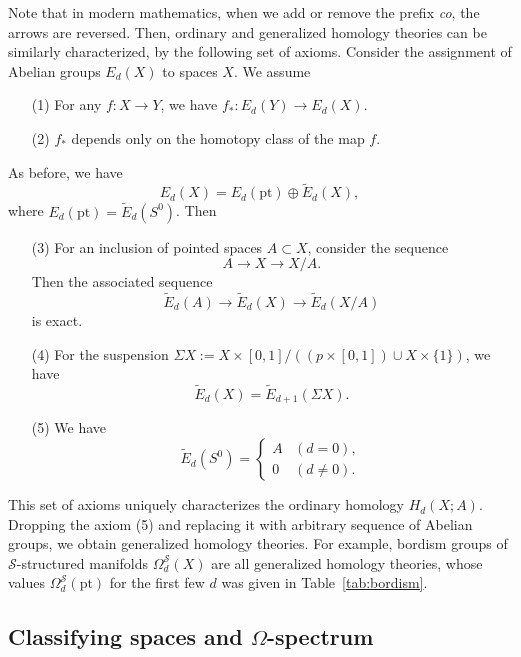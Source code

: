 \documentclass[12pt]{article}
\numberwithin{equation}{section}
\numberwithin{figure}{section}
\theoremstyle{remark}
\def\cS{\mathcal{S}}
\def\pt{\mathrm{pt}}
\begin{document}
Note that in modern mathematics, when we add or remove the prefix \emph{co},
the arrows are reversed.
Then, ordinary and generalized homology theories can be similarly characterized,
by the following set of axioms.
Consider the assignment of Abelian groups $E_d(X)$ to spaces $X$. We assume
\begin{enumerate}
\item[(1)] For any $f:X\to Y$, we have  $f_*: E_d(Y)\to E_d(X)$. 
\item[(2)] $f_*$ depends only on the homotopy class of the map $f$.
\end{enumerate}
As before, we have
\begin{equation}
E_d(X)=E_d(\pt) \oplus \tilde E_d(X),
\end{equation} 
where $E_d(\pt)=\tilde E_d(S^0)$.
Then 
\begin{enumerate}
\item[(3)] For an inclusion of pointed spaces $A\subset X$, consider the sequence \begin{equation}
A\to X\to X/A.
\end{equation} Then the associated sequence \begin{equation}
\tilde E_d(A) \to \tilde E_d(X)\to \tilde E_d(X/A)
\end{equation} is exact.
\item[(4)] For the suspension $\Sigma X := X\times [0,1] / ( (p\times [0,1]) \cup X\times \{1\})$, we have \begin{equation}
\tilde E_d(X)=\tilde E_{d+1}(\Sigma X).
\end{equation}
\item[(5)] We have \begin{equation}
\tilde E_d(S^0) = \begin{cases}
A & (d=0),\\
0 & (d\neq 0).
\end{cases}
\end{equation}
\end{enumerate}

This set of axioms uniquely characterizes the ordinary homology $H_d(X;A)$.
Dropping the axiom (5) and replacing it with arbitrary sequence of Abelian groups,
we obtain generalized homology theories. For example,
bordism groups of $\cS$-structured manifolds $\Omega^{\cS}_d(X)$ are all 
generalized homology theories,
whose values $\Omega^{\cS}_d(\pt)$ for the first few $d$ was given in Table~\ref{tab:bordism}.

\subsection{Classifying spaces and $\Omega$-spectrum}
\end{document}
